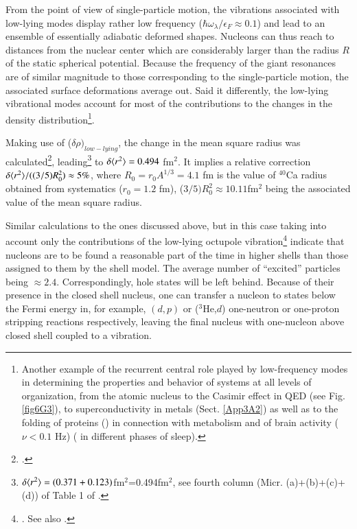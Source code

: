 From the point of view of  single-particle motion, the vibrations associated with low-lying modes display rather low frequency ($\hbar\omega_\lambda/\epsilon_F\approx0.1$) and lead to an ensemble of essentially adiabatic deformed shapes. Nucleons can thus reach to distances from the nuclear center which are considerably larger than the radius $R$ of the static spherical potential. Because the frequency of the giant resonances are of similar magnitude to those corresponding to the single-particle motion, the associated surface deformations average out. 
Said it differently,  the low-lying vibrational modes  account for most of the contributions to the changes in the density distribution\footnote{\label{f52C1} Another example of the  recurrent central role played by low-frequency modes in determining the properties and behavior of systems at all levels of organization, from the atomic nucleus to the Casimir effect in QED (see Fig. \ref{fig6G3}), to  superconductivity in metals (Sect. \ref{App3A2}) as well as  to the folding of proteins (\cite{Micheletti:04}) in connection with metabolism and of brain  activity ($\nu<0.1$ Hz) (\cite{Mitra:18,Vyazovskiy:13} in different phases of sleep).}. 


Making use of  ($\delta\rho)_{low-lying}$, the change in the mean square radius  was calculated\footnote{\cite{Barranco:87a}.}, leading\footnote{$\delta\langle {r^2} \rangle=(0.371+0.123)$fm$^2$=0.494fm$^2$, see fourth column (Micr. (a)+(b)+(c)+(d)) of Table 1 of \cite{Barranco:87a}.} to $\delta\langle {r^2} \rangle=0.494$ fm$^2$. It implies a relative correction $\delta\langle {r^2} \rangle/((3/5)R_0^2)\approx5\%$, where $R_0=r_0A^{1/3}=4.1$ fm is the value of $^{40}$Ca radius obtained from systematics ($r_0=1.2$ fm), ($3/5)R_0^2\approx 10.11$fm$^2$ being the associated value of the mean square radius.

Similar calculations to the ones discussed above, but in this case taking into account only the contributions of the low-lying octupole vibration\footnote{\cite{Brown:63}. See also \cite{Anderson:62}.} indicate that nucleons are to be found a reasonable part of the time in higher shells than those assigned to them by the shell model. The average number of ``excited'' particles being $\approx2.4$. 
Correspondingly, hole states will be left behind. Because of their presence  in the closed shell nucleus, one can transfer a nucleon to states below the Fermi energy in, for example, $(d,p)$ or ($^3$He,$d$) one-neutron or one-proton stripping reactions respectively, leaving the final nucleus with one-nucleon above closed shell coupled to a vibration.


